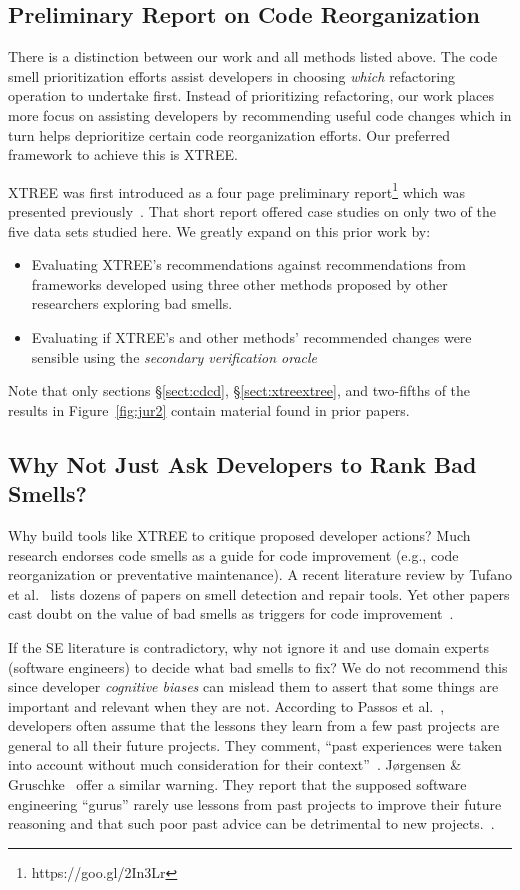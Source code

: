 \documentclass[twocolumn,5p]{elsarticle}
\newcommand{\bi}{\begin{itemize}[leftmargin=0.4cm]}
\newcommand{\ei}{\end{itemize}}
\newcommand{\tion}[1]{\S\ref{sect:#1}}
\newcommand{\fig}[1]{Figure~\ref{fig:#1}}
\theoremstyle{break}
\begin{document}
{		
		\subsection{Preliminary Report on Code Reorganization}
		There is a distinction between our work and all methods listed above. 
		The code smell prioritization efforts assist developers in choosing 
		\textit{which} refactoring operation to undertake first. Instead of 
		prioritizing refactoring, our work places more focus on assisting 
		developers by recommending useful code changes which in turn helps 
		deprioritize certain code reorganization efforts. Our preferred 
		framework 
		to 
		achieve this is XTREE.}
	
	XTREE was first introduced as a four page preliminary 
	report\footnote{https://goo.gl/2In3Lr} which was presented 
	previously~\cite{krishna2015actionable}. That short report offered case 
	studies on only two  of
	the five data sets studied here. We greatly expand on this prior work by:
	\bi
	\item
	Evaluating XTREE's recommendations against recommendations from frameworks 
	developed using three other methods proposed by other researchers exploring 
	bad 
	smells.
	\item
	Evaluating if XTREE's and other methods' recommended changes were sensible 
	using the {\em secondary verification oracle}
	\ei
	Note that only sections \tion{cdcd}, \tion{xtreextree}, and two-fifths of the results 
	in \fig{jur2} 
	contain material
	found in prior papers.
	
	
	
	\subsection{Why Not Just Ask Developers to Rank Bad 
	Smells?}\label{sect:prelim}
	
	Why build tools like XTREE to  critique proposed developer actions?
	Much research endorses code smells as a guide for
	code improvement (e.g., code reorganization or preventative maintenance). 
	A 
	recent literature review by Tufano et al.~\cite{Tufano2015}
	lists dozens of papers on smell detection and repair tools.
	Yet
	other papers cast doubt on the value of bad smells
	as triggers for code 
	improvement~\cite{Mantyla2004,Yamashita2013,Sjoberg2013}.
	
	If the SE literature is contradictory, why not ignore it and use domain 
	experts (software engineers) to decide
	what bad smells to fix? We do not recommend this since developer {\em 
	cognitive biases} can mislead them to
	assert that some things are important and relevant when they are not.
	According to Passos et al.~\cite{passos11},  developers often  assume that 
	the lessons they learn from a few past projects are general to all their 
	future projects. They comment, ``past experiences were taken into account 
	without much consideration for their context''~\cite{passos11}.  
	J{\o}rgensen \& Gruschke~\cite{jorgensen09} offer a similar warning. They 
	report that the supposed software engineering ``gurus'' rarely use lessons 
	from past projects to improve their future reasoning and that such poor 
	past advice can be detrimental to new projects.~\cite{jorgensen09}.
\end{document}
